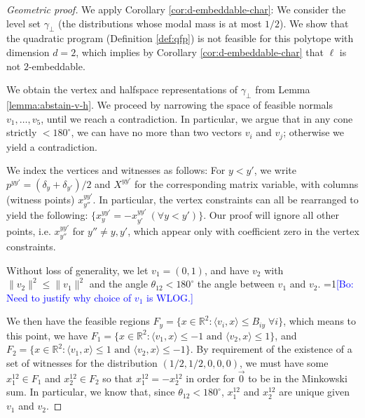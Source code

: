 \documentclass[anon]{colt2020} %
\newcommand{\Comments}{1}
\newcommand{\mynote}[2]{\ifnum\Comments=1\textcolor{#1}{#2}\fi}
\newcommand{\bo}[1]{\mynote{blue}{[Bo: #1]}}
\newcommand{\reals}{\mathbb{R}}
\newcommand{\inprod}[2]{\langle #1, #2 \rangle}%
\begin{document}
\begin{proof}[Geometric proof]
  We apply Corollary \ref{cor:d-embeddable-char}: We consider the level set $\gamma_{\bot}$ (the distributions whose modal mass is at most $1/2$).
  We show that the quadratic program (Definition \ref{def:qfp}) is not feasible for this polytope with dimension $d=2$, which implies by Corollary \ref{cor:d-embeddable-char} that $\ell$ is not $2$-embeddable.

  We obtain the vertex and halfspace representations of $\gamma_{\bot}$ from Lemma \ref{lemma:abstain-v-h}.
  We proceed by narrowing the space of feasible normals $v_1, \ldots, v_5$, until we reach a contradiction.
  In particular, we argue that in any cone strictly $ < 180^\circ$, we can have no more than two vectors $v_i$ and $v_j$; otherwise we yield a contradiction.

  We index the vertices and witnesses as follows: For $y < y'$, we write $p^{yy'} = (\delta_y + \delta_{y'})/2$ and $X^{yy'}$ for the corresponding matrix variable, with columns (witness points) $x^{yy'}_{y''}$.
  In particular, the vertex constraints can all be rearranged to yield the following: $\{x^{yy'}_y = -x^{yy'}_{y'} ~ (\forall y < y')\}$.
  Our proof will ignore all other points, i.e. $x^{yy'}_{y''}$ for $y'' \neq y,y'$, which appear only with coefficient zero in the vertex constraints.

  Without loss of generality, we let $v_1 = (0,1)$, and have $v_2$ with $\|v_2\|^2 \leq \|v_1\|^2$ and the angle $\theta_{12} < 180^\circ$ the angle between $v_1$ and $v_2$. \bo{Need to justify why choice of $v_1$ is WLOG.}

  We then have the feasible regions $F_y = \{x \in \reals^2 : \inprod{v_i} {x} \leq B_{iy} \; \forall i\}$, which means to this point, we have $F_1 = \{x \in \reals^2 : \inprod{v_1}{x} \leq -1 \text{ and } \inprod{v_2}{x} \leq 1 \}$, and $F_2 = \{x \in \reals^2 : \inprod{v_1}{x} \leq 1 \text{ and } \inprod{v_2}{x} \leq -1 \}$.
  By requirement of the existence of a set of witnesses for the distribution $(1/2, 1/2, 0,0,0)$, we must have some $x^{12}_1 \in F_1$ and $x^{12}_2 \in F_2$ so that $x^{12}_1 = -x^{12}_2$ in order for $\vec 0$ to be in the Minkowski sum.
  In particular, we know that, since $\theta_{12} < 180^\circ$, $x^{12}_1$ and $x^{12}_2$ are unique given $v_1$ and $v_2$.


\end{proof}
\end{document}
